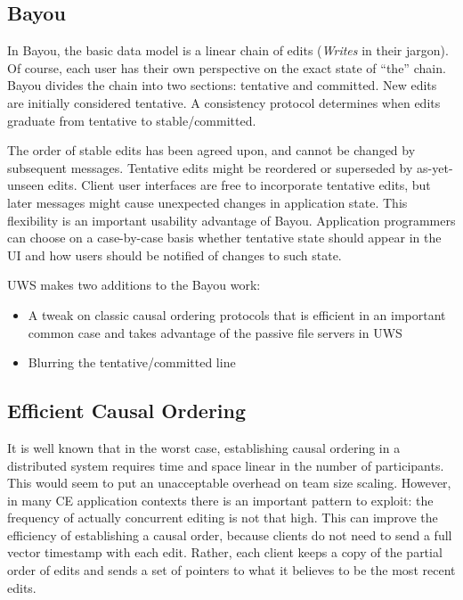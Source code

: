 \documentclass[runningheads]{llncs}
\begin{document}
\subsection{Bayou}

In Bayou, the basic data model is a linear chain of edits (\emph{Writes} in their jargon).
Of course, each user has their own perspective on the exact state of ``the'' chain.
Bayou divides the chain into two sections: tentative and committed.
New edits are initially considered tentative.
A consistency protocol determines when edits graduate from tentative to stable{\slash}committed.

The order of stable edits has been agreed upon, and cannot be changed by subsequent messages.
Tentative edits might be reordered or superseded by as-yet-unseen edits.
Client user interfaces are free to incorporate tentative edits, but later messages might cause unexpected changes in application state.
This flexibility is an important usability advantage of Bayou.
Application programmers can choose on a case-by-case basis whether tentative state should appear in the UI and how users should be notified of changes to such state.

UWS makes two additions to the Bayou work:

\begin{itemize}
\item A tweak on classic causal ordering protocols that is efficient in an important common case and takes advantage of the passive file servers in UWS
\item Blurring the tentative{\slash}committed line
\end{itemize}

\subsection{Efficient Causal Ordering}

It is well known that in the worst case, establishing causal ordering in a distributed system requires time and space linear in the number of participants.
This would seem to put an unacceptable overhead on team size scaling.
However, in many CE application contexts there is an important pattern to exploit: the frequency of actually concurrent editing is not that high.
This can improve the efficiency of establishing a causal order, because clients do not need to send a full vector timestamp with each edit.
Rather, each client keeps a copy of the partial order of edits and sends a set of pointers to what it believes to be the most recent edits.
\end{document}
